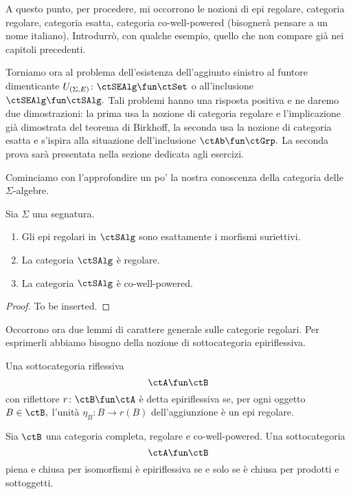 \begin{warning}\label{caveat_reg_ex}
A questo punto, per procedere, mi occorrono le nozioni di epi regolare, categoria regolare, categoria esatta, categoria
co-well-powered (bisognerà pensare a un nome italiano). Introdurrò, con qualche esempio, quello che non compare già 
nei capitoli precedenti.
\end{warning} 

Torniamo ora al problema dell'esistenza dell'aggiunto sinistro al funtore dimenticante $U_{(\Sigma,E)} \colon \ctSEAlg \fun \ctSet$
o all'inclusione $\ctSEAlg \fun \ctSAlg.$ Tali problemi hanno una risposta positiva e ne daremo due dimostrazioni: la prima usa la 
nozione di categoria regolare e l'implicazione già dimostrata del teorema di Birkhoff, la seconda usa la nozione di categoria esatta e
s'ispira alla situazione dell'inclusione $\ctAb \fun \ctGrp.$ La seconda prova sarà presentata nella sezione dedicata agli esercizi. 

Cominciamo con l'approfondire un po' la nostra conoscenza della categoria delle $\Sigma$-algebre.

\begin{proposition}\label{prop_alg_reg}
Sia $\Sigma$ una segnatura.
\begin{enumerate}
\item Gli epi regolari in $\ctSAlg$ sono esattamente i morfismi suriettivi.
\item La categoria $\ctSAlg$ è regolare.
\item La categoria $\ctSAlg$ è co-well-powered.
\end{enumerate}
\end{proposition}

\begin{proof}
To be inserted.
\end{proof}

Occorrono ora due lemmi di carattere generale sulle categorie regolari. Per esprimerli abbiamo bisogno della nozione di
sottocategoria epiriflessiva.

\begin{definition}\label{def_sottocat_epirifl}
Una sottocategoria riflessiva
$$\ctA \fun \ctB$$
con riflettore $r \colon \ctB \fun \ctA$ è detta epiriflessiva se, per ogni oggetto $B \in \ctB,$ l'unità $\eta_B \colon B \to r(B)$
dell'aggiunzione è un epi regolare.
\end{definition} 

\begin{lemma}\label{lemma_caract_epirifl}
Sia $\ctB$ una categoria completa, regolare e co-well-powered. Una sottocategoria
$$\ctA \fun \ctB$$
piena e chiusa per isomorfismi è epiriflessiva se e solo se è chiusa per prodotti e sottoggetti.
\end{lemma}

